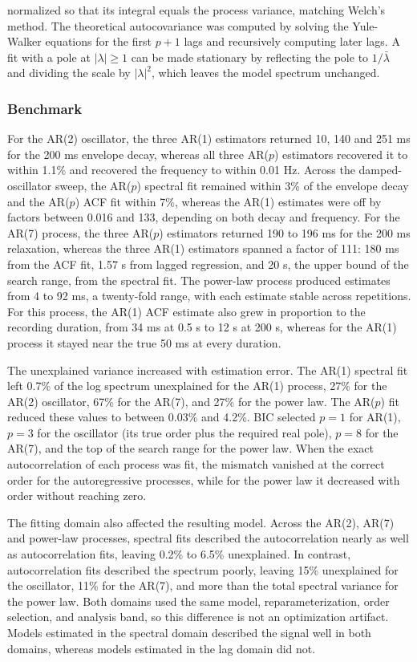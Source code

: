 \documentclass[pdflatex,lineno,sn-nature]{sn-jnl}
\theoremstyle{thmstyleone}
\theoremstyle{thmstyletwo}
\theoremstyle{thmstylethree}
\begin{document}
normalized so that its integral equals the process variance, matching Welch's method. The theoretical autocovariance was computed by solving the Yule-Walker equations for the first $p+1$ lags and recursively computing later lags. A fit with a pole at $|\lambda| \ge 1$ can be made stationary by reflecting the pole to $1/\bar\lambda$ and dividing the scale by $|\lambda|^2$, which leaves the model spectrum unchanged.

\subsubsection*{Benchmark}

For the AR(2) oscillator, the three AR(1) estimators returned 10, 140 and 251 ms for the 200 ms envelope decay, whereas all three AR($p$) estimators recovered it to within 1.1\% and recovered the frequency to within 0.01 Hz. Across the damped-oscillator sweep, the AR($p$) spectral fit remained within 3\% of the envelope decay and the AR($p$) ACF fit within 7\%, whereas the AR(1) estimates were off by factors between 0.016 and 133, depending on both decay and frequency. For the AR(7) process, the three AR($p$) estimators returned 190 to 196 ms for the 200 ms relaxation, whereas the three AR(1) estimators spanned a factor of 111: 180 ms from the ACF fit, 1.57 s from lagged regression, and 20 s, the upper bound of the search range, from the spectral fit. The power-law process produced estimates from 4 to 92 ms, a twenty-fold range, with each estimate stable across repetitions. For this process, the AR(1) ACF estimate also grew in proportion to the recording duration, from 34 ms at 0.5 s to 12 s at 200 s, whereas for the AR(1) process it stayed near the true 50 ms at every duration.

The unexplained variance increased with estimation error. The AR(1) spectral fit left 0.7\% of the log spectrum unexplained for the AR(1) process, 27\% for the AR(2) oscillator, 67\% for the AR(7), and 27\% for the power law. The AR($p$) fit reduced these values to between 0.03\% and 4.2\%. BIC selected $p=1$ for AR(1), $p=3$ for the oscillator (its true order plus the required real pole), $p=8$ for the AR(7), and the top of the search range for the power law. When the exact autocorrelation of each process was fit, the mismatch vanished at the correct order for the autoregressive processes, while for the power law it decreased with order without reaching zero.

The fitting domain also affected the resulting model. Across the AR(2), AR(7) and power-law processes, spectral fits described the autocorrelation nearly as well as autocorrelation fits, leaving 0.2\% to 6.5\% unexplained. In contrast, autocorrelation fits described the spectrum poorly, leaving 15\% unexplained for the oscillator, 11\% for the AR(7), and more than the total spectral variance for the power law. Both domains used the same model, reparameterization, order selection, and analysis band, so this difference is not an optimization artifact. Models estimated in the spectral domain described the signal well in both domains, whereas models estimated in the lag domain did not.
\end{document}
